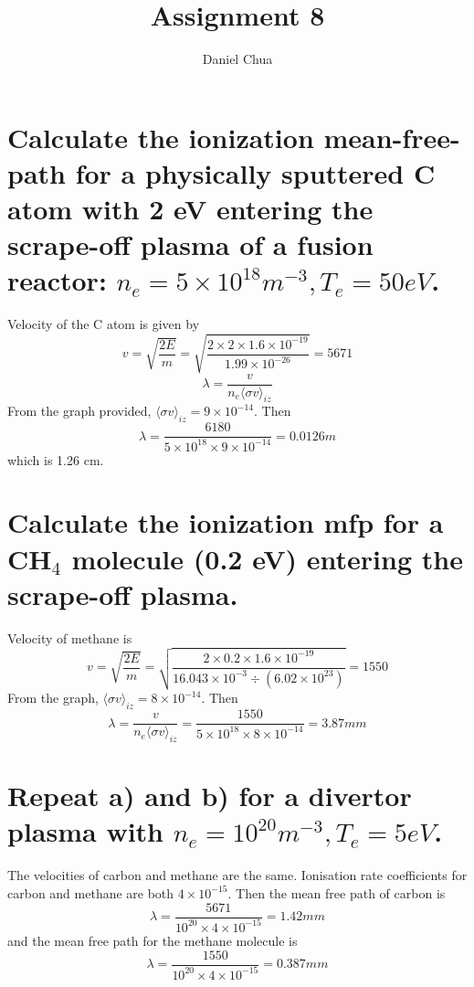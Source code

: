 \documentclass[answers]{exam}
\title{Assignment 8}
\author{Daniel Chua}
\begin{document}
\maketitle

\begin{questions}

\question{}

\begin{parts}

\part{Calculate the ionization mean-free-path for a physically sputtered C atom with 2 eV entering the scrape-off plasma of a fusion reactor: $n_e = 5 \times 10^{18} \unit{m^{-3}}, T_e = 50 \unit{eV}$.}

\begin{solution}
    Velocity of the C atom is given by
    $$v = \sqrt{\frac{2E}{m}} = \sqrt{\frac{2\times2\times1.6\times10^{-19}}{1.99\times10^{-26}}} = 5671$$
    $$\lambda = \frac{v}{n_e\langle \sigma v \rangle_{iz}}$$
    From the graph provided, $\langle \sigma v\rangle_{iz} = 9\times10^{-14}$. Then
    $$\lambda = \frac{6180}{5\times10^{18}\times9\times10^{-14}} = 0.0126\unit{m}$$
    which is 1.26 cm.
\end{solution}

\part{Calculate the ionization mfp for a CH$_4$ molecule (0.2 eV) entering the scrape-off plasma.}

\begin{solution}
    Velocity of methane is
    $$v = \sqrt{\frac{2E}{m}} = \sqrt{\frac{2 \times 0.2 \times 1.6 \times 10^{-19}}{16.043 \times 10^{-3} \div \left(6.02 \times 10^{23}\right)}} = 1550$$
    From the graph, $\langle \sigma v \rangle_{iz} = 8 \times 10^{-14}$. Then
    $$\lambda = \frac{v}{n_e\langle \sigma v \rangle_{iz}} = \frac{1550}{5\times10^{18}\times8\times10^{-14}} = 3.87\unit{mm}$$
\end{solution}

\part{Repeat a) and b) for a divertor plasma with $n_e = 10^{20} \unit{m^{-3}}, T_e = 5 \unit{eV}$.}

\begin{solution}
    The velocities of carbon and methane are the same. Ionisation rate coefficients for carbon and methane are both $4\times10^{-15}$. Then the mean free path of carbon is
    $$\lambda = \frac{5671}{10^{20}\times4\times10^{-15}} = 1.42 \unit{mm}$$
    and the mean free path for the methane molecule is
    $$\lambda = \frac{1550}{10^{20}\times4\times10^{-15}} = 0.387\unit{mm}$$
\end{solution}


\end{parts}
\end{questions}
\end{document}
